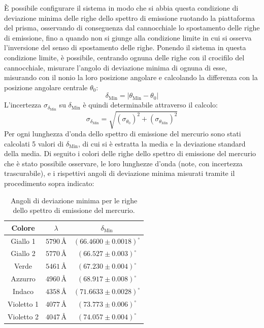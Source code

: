 \documentclass[a4paper,12pt]{article}
\begin{document}
È possibile configurare il sistema in modo che si abbia questa condizione di deviazione minima delle righe dello spettro di emissione ruotando la piattaforma del prisma, osservando di conseguenza dal cannocchiale lo spostamento delle righe di emissione, fino a quando non si giunge alla condizione limite in cui si osserva l’inversione del senso di spostamento delle righe.
Ponendo il sistema in questa condizione limite, è possibile, centrando ognuna delle righe con il crocifilo del cannocchiale, misurare l’angolo di deviazione minima di ognuna di esse, misurando con il nonio la loro posizione angolare e calcolando la differenza con la posizione angolare centrale \( \theta_0 \):
\[
\delta_{\text{Min}} = |\theta_{\text{Min}} - \theta_0|
\]
L’incertezza \( \sigma_{\delta_{\text{Min}}} \) su \( \delta_{\text{Min}} \) è quindi determinabile attraverso il calcolo:
\[
\sigma_{\delta_{\text{Min}}} = \sqrt{(\sigma_{\theta_0})^2 + (\sigma_{\theta_{\text{Min}}})^2}
\]
Per ogni lunghezza d’onda dello spettro di emissione del mercurio sono stati calcolati 5 valori di \( \delta_{\text{Min}} \), di cui si è estratta la media e la deviazione standard della media.
Di seguito i colori delle righe dello spettro di emissione del mercurio che è stato possibile osservare, le loro lunghezze d’onda (note, con incertezza trascurabile), e i rispettivi angoli di deviazione minima misurati tramite il procedimento sopra indicato:

\begin{table}[H]
    \centering
    \begin{tabular}{ccc}
    \hline
    \textbf{Colore} & \textbf{\( \lambda \)} & \textbf{\( \delta_{\text{Min}} \)} \\ \hline
    Giallo 1 & \( 5790 \, \text{\AA} \) & \( (66.4600 \pm 0.0018)^\circ \) \\ 
    Giallo 2 & \( 5770 \, \text{\AA} \) & \( (66.527 \pm 0.003)^\circ \) \\ 
    Verde & \( 5461 \, \text{\AA} \) & \( (67.230 \pm 0.004)^\circ \) \\ 
    Azzurro & \( 4960 \, \text{\AA} \) & \( (68.917 \pm 0.008)^\circ \) \\ 
    Indaco & \( 4358 \, \text{\AA} \) & \( (71.6633 \pm 0.0028)^\circ \) \\ 
    Violetto 1 & \( 4077 \, \text{\AA} \) & \( (73.773 \pm 0.006)^\circ \) \\ 
    Violetto 2 & \( 4047 \, \text{\AA} \) & \( (74.057 \pm 0.004)^\circ \) \\ \hline
    \end{tabular}
    \caption{Angoli di deviazione minima per le righe dello spettro di emissione del mercurio.}
    \label{tab:angoli_deviazione_minima}
\end{table}
    
\end{document}
